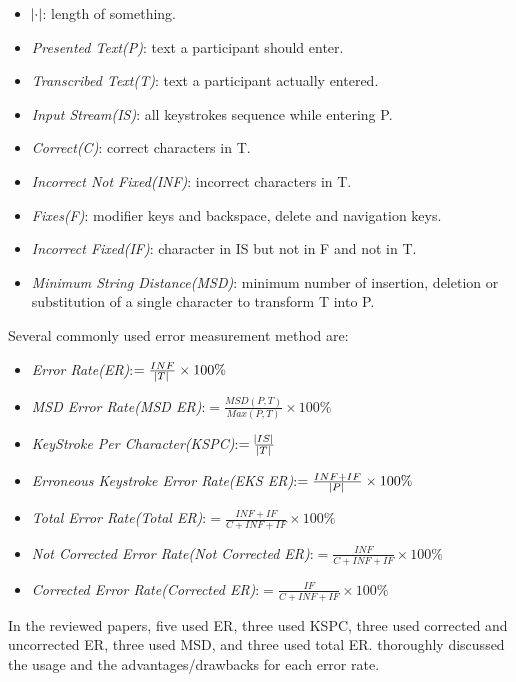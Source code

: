 \documentclass[11pt]{article}
\begin{document}
\begin{itemize}
    \item $\abs{\cdot}$: length of something.
    \item \textit{Presented Text(P)}: text a participant should enter.
    \item \textit{Transcribed Text(T)}: text a participant actually entered.
    \item \textit{Input Stream(IS)}: all keystrokes sequence while entering P.
    \item \textit{Correct(C)}: correct characters in T.
    \item \textit{Incorrect Not Fixed(INF)}: incorrect characters in T.
    \item \textit{Fixes(F)}: modifier keys and backspace, delete and navigation keys.
    \item \textit{Incorrect Fixed(IF)}: character in IS but not in F and not in T.
    \item \textit{Minimum String Distance(MSD)}: minimum number of insertion, deletion or substitution of a single character to transform T into P.

\end{itemize}

Several commonly used error measurement method are:

\begin{itemize}
    \item \textit{Error Rate(ER)}:$=\frac{INF}{\abs{T}}\times 100\%$
    \item \textit{MSD Error Rate(MSD ER)}:$=\frac{MSD(P,T)}{Max(P,T)}\times 100\%$
    \item \textit{KeyStroke Per Character(KSPC)}:$=\frac{\abs{IS}}{\abs{T}}$
    \item \textit{Erroneous Keystroke Error Rate(EKS ER)}:$=\frac{INF+IF}{\abs{P}}\times 100\%$
    \item \textit{Total Error Rate(Total ER)}:$=\frac{INF+IF}{C+INF+IF}\times 100\%$
    \item \textit{Not Corrected Error Rate(Not Corrected ER)}:$=\frac{INF}{C+INF+IF}\times 100\%$
    \item \textit{Corrected Error Rate(Corrected ER)}:$=\frac{IF}{C+INF+IF}\times 100\%$
\end{itemize}

In the reviewed papers, five used ER, three used KSPC, three used corrected and uncorrected ER, three used MSD, and three used total ER. \citet{10.1145/642611.642632, 10.5555/1970759, 54444533} thoroughly discussed the usage and the advantages/drawbacks for each error rate.
\end{document}
